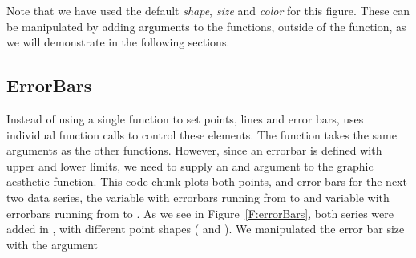 \documentclass[nojss]{jss}\usepackage[]{graphicx}\usepackage[]{color}
\begin{document}
Note that we have used the default \emph{shape}, \emph{size} and \emph{color} for this figure. These can be manipulated by adding arguments to the  functions, outside of the  function, as we will demonstrate in the following sections.

\subsection{ErrorBars}\label{S:errorbars}

Instead of using a single function to set points, lines and error bars,  uses individual function calls to control these elements. The  function takes the same arguments as the other  functions. However, since an errorbar is defined with upper and lower limits, we need to supply an  and  argument to the graphic aesthetic function. This code chunk plots both points, and error bars for the next two data series, the  variable with errorbars running from  to  and  variable with errorbars running from  to . As we see in Figure~\ref{F:errorBars}, both series were added in , with different point shapes ( and ). We manipulated the error bar size with the  argument
\end{document}
